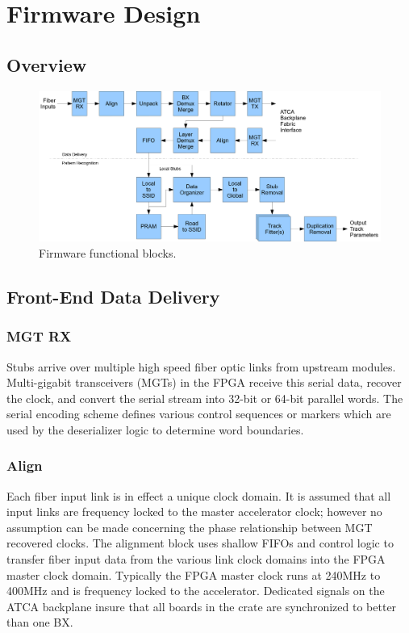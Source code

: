 \documentclass[letterpaper]{article}
\begin{document}
\section{Firmware Design}

\subsection{Overview}

\begin{figure}
\centering
\includegraphics[width=16cm]{fwblock.png}
\caption{Firmware functional blocks.}
\label{fwblock}
\end{figure}

\subsection{Front-End Data Delivery}

\subsubsection{MGT RX}

Stubs arrive over multiple high speed fiber optic links from upstream modules.  Multi-gigabit transceivers (MGTs) in the FPGA receive this serial data, recover the clock, and convert the serial stream into 32-bit or 64-bit parallel words.  The serial encoding scheme defines various control sequences or markers which are used by the deserializer logic to determine word boundaries.

\subsubsection{Align}

Each fiber input link is in effect a unique clock domain.  It is assumed that all input links are frequency locked to the master accelerator clock; however no assumption can be made concerning the phase relationship between MGT recovered clocks.  The alignment block uses shallow FIFOs and control logic to transfer fiber input data from the various link clock domains into the FPGA master clock domain.  Typically the FPGA master clock runs at 240MHz to 400MHz and is frequency locked to the accelerator.  Dedicated signals on the ATCA backplane insure that all boards in the crate are synchronized to better than one BX.
\end{document}
